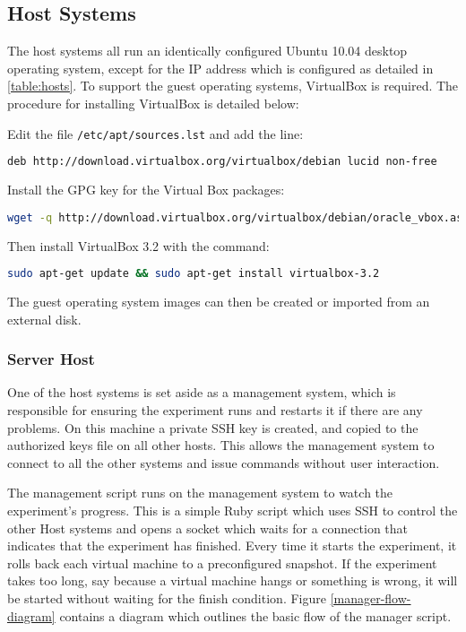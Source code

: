 \subsection{Host Systems}

The host systems all run an identically configured Ubuntu 10.04 desktop
operating system, except for the IP address which is configured as detailed in
\ref{table:hosts}. To support the guest operating systems, VirtualBox is
required. The procedure for installing VirtualBox is detailed below:

\begin{enumerate*}
  \item Edit the file \verb+/etc/apt/sources.lst+ and add the line:
\begin{lstlisting}[language=sh]
deb http://download.virtualbox.org/virtualbox/debian lucid non-free
\end{lstlisting}
  \item Install the GPG key for the Virtual Box packages:
\begin{lstlisting}[language=sh]
wget -q http://download.virtualbox.org/virtualbox/debian/oracle_vbox.asc -O- | sudo apt-key add -
\end{lstlisting}
  \item Then install VirtualBox 3.2 with the command:
\begin{lstlisting}[language=sh]
sudo apt-get update && sudo apt-get install virtualbox-3.2
\end{lstlisting}
\end{enumerate*}

The guest operating system images can then be created or imported from an
external disk.

\subsubsection{Server Host}

One of the host systems is set aside as a management system, which is
responsible for ensuring the experiment runs and restarts it if there are any
problems. On this machine a private SSH key is created, and copied to the
authorized keys file on all other hosts. This allows the management system to
connect to all the other systems and issue commands without user interaction.

The management script runs on the management system to watch the experiment's
progress. This is a simple Ruby script which uses SSH to control the other Host
systems and opens a socket which waits for a connection that indicates that the
experiment has finished. Every time it starts the experiment, it rolls back
each virtual machine to a preconfigured snapshot. If the experiment takes too
long, say because a virtual machine hangs or something is wrong, it will be
started without waiting for the finish condition. Figure
\ref{manager-flow-diagram} contains a diagram which outlines the basic flow of
the manager script.

